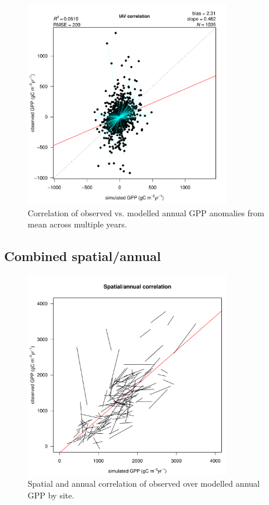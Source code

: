 \documentclass{myreport}
\begin{document}
\begin{figure}[!ht]
    \centering
    \includegraphics[width=0.8\textwidth]{fig/modobs_anomalies_annual.pdf}
    \caption{Correlation of observed vs. modelled annual GPP anomalies from mean across multiple years.}
    \label{fig:modobs_iav}
\end{figure}

\clearpage


\subsection{Combined spatial/annual}

\begin{figure}[!ht]
    \centering
    \includegraphics[width=0.8\textwidth]{fig/modobs_spatial_annual.pdf}
    \caption{Spatial and annual correlation of observed over modelled annual GPP by site.}
    \label{fig:modobs_spatialannual}
\end{figure}
\end{document}
